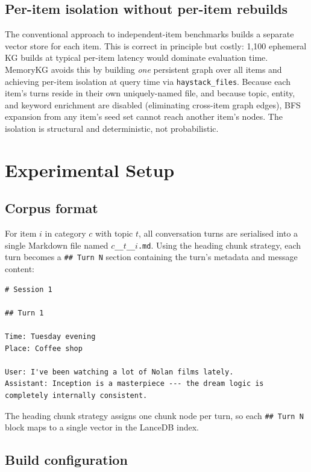 \documentclass[11pt,a4paper]{article}
\begin{document}
\subsection{Per-item isolation without per-item rebuilds}

The conventional approach to independent-item benchmarks builds a separate
vector store for each item.
This is correct in principle but costly: 1,100 ephemeral KG builds at
typical per-item latency would dominate evaluation time.
MemoryKG avoids this by building \emph{one} persistent graph over all items
and achieving per-item isolation at query time via \texttt{haystack\_files}.
Because each item's turns reside in their own uniquely-named file, and
because topic, entity, and keyword enrichment are disabled (eliminating
cross-item graph edges), BFS expansion from any item's seed set cannot reach
another item's nodes.
The isolation is structural and deterministic, not probabilistic.

\section{Experimental Setup}
\label{sec:setup}

\subsection{Corpus format}

For item $i$ in category $c$ with topic $t$, all conversation turns are
serialised into a single Markdown file named
\texttt{$c$\_\_$t$\_\_$i$.md}.
Using the heading chunk strategy, each turn becomes a \texttt{\#\#~Turn~N}
section containing the turn's metadata and message content:

\begin{lstlisting}
# Session 1

## Turn 1

Time: Tuesday evening
Place: Coffee shop

User: I've been watching a lot of Nolan films lately.
Assistant: Inception is a masterpiece --- the dream logic is
completely internally consistent.
\end{lstlisting}

The heading chunk strategy assigns one chunk node per turn, so each
\texttt{\#\#~Turn~N} block maps to a single vector in the LanceDB index.

\subsection{Build configuration}
\end{document}
